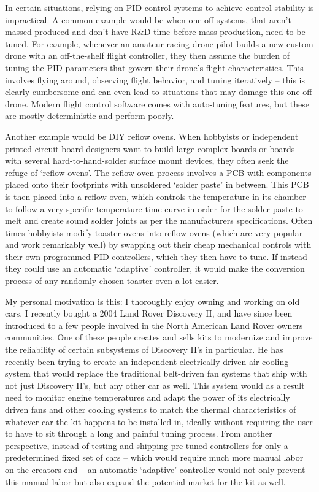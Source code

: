 \documentclass[10pt,twocolumn,letterpaper]{article}
\begin{document}
        In certain situations, relying on PID control systems to achieve control stability is impractical. A common
        example would be when one-off systems, that aren't massed produced and don't have R\&D time before mass
        production, need to be tuned. For example, whenever an amateur racing drone pilot builds a new custom drone with
        an off-the-shelf flight controller, they then assume the burden of tuning the PID parameters that govern their
        drone's flight characteristics. This involves flying around, observing flight behavior, and tuning iteratively
        -- this is clearly cumbersome and can even lead to situations that may damage this one-off drone. Modern flight
        control software comes with auto-tuning features, but these are mostly deterministic and perform poorly.

        Another example would be DIY reflow ovens. When hobbyists or independent printed circuit board designers want to
        build large complex boards or boards with several hard-to-hand-solder surface mount devices, they often seek the
        refuge of `reflow-ovens'. The reflow oven process involves a PCB with components placed onto their footprints
        with unsoldered `solder paste' in between. This PCB is then placed into a reflow oven, which controls the
        temperature in its chamber to follow a very specific temperature-time curve in order for the solder paste to
        melt and create sound solder joints as per the manufacturers specifications. Often times hobbyists modify
        toaster ovens into reflow ovens (which are very popular and work remarkably well) by swapping out their cheap
        mechanical controls with their own programmed PID controllers, which they then have to tune. If instead they
        could use an automatic `adaptive' controller, it would make the conversion process of any randomly chosen
        toaster oven a lot easier. 

        My personal motivation is this: I thoroughly enjoy owning and working on old cars. I recently bought a 2004 Land
        Rover Discovery II, and have since been introduced to a few people involved in the North American Land Rover
        owners communities. One of these people creates and sells kits to modernize and improve the reliability of
        certain subsystems of Discovery II's in particular. He has recently been trying to create an independent
        electrically driven air cooling system that would replace the traditional belt-driven fan systems that ship with
        not just Discovery II's, but any other car as well. This system would as a result need to monitor engine
        temperatures and adapt the power of its electrically driven fans and other cooling systems to match the thermal
        characteristics of whatever car the kit happens to be installed in, ideally without requiring the user to have
        to sit through a long and painful tuning process. From another perspective, instead of testing and shipping
        pre-tuned controllers for only a predetermined fixed set of cars -- which would require much more manual labor
        on the creators end -- an automatic `adaptive' controller would not only prevent this manual labor but also
        expand the potential market for the kit as well.
\end{document}
